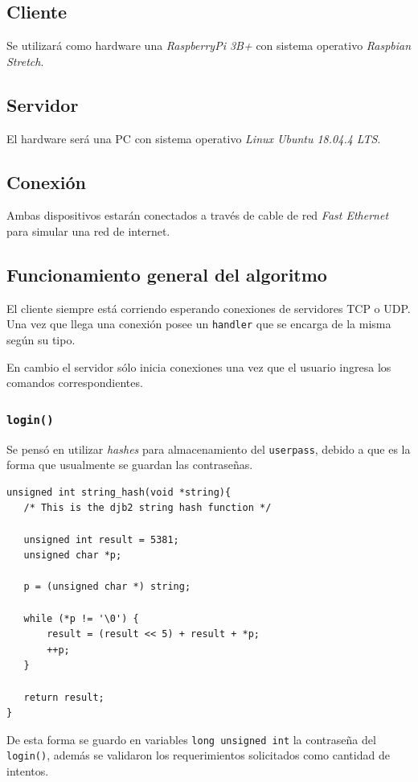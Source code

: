 \documentclass[14.5pt,a4paper]{article}
\begin{document}
\subsection{Cliente}
Se utilizará como hardware una \textit{RaspberryPi 3B+} con sistema operativo \textit{Raspbian Stretch}.

\subsection{Servidor}
El hardware será una PC con sistema operativo \textit{Linux Ubuntu 18.04.4 LTS}.

\subsection{Conexión}
Ambas dispositivos estarán conectados a través de cable de red \textit{Fast Ethernet} para simular una red de internet.

\subsection{Funcionamiento general del algoritmo}
El cliente siempre está corriendo esperando conexiones de servidores TCP o UDP. Una vez que llega una conexión posee un \texttt{handler} que se encarga de la misma según su tipo.

En cambio el servidor sólo inicia conexiones una vez que el usuario ingresa los comandos correspondientes.

\subsubsection{\texttt{login()}}
Se pensó en utilizar \textit{hashes} para almacenamiento del \texttt{userpass}, debido a que es la forma que usualmente se guardan las contraseñas.

\begin{lstlisting}
unsigned int string_hash(void *string){
   /* This is the djb2 string hash function */

   unsigned int result = 5381;
   unsigned char *p;

   p = (unsigned char *) string;

   while (*p != '\0') {
	   result = (result << 5) + result + *p;
	   ++p;
   }

   return result;
}
\end{lstlisting}

De esta forma se guardo en variables \texttt{long unsigned int} la contraseña del \texttt{login()}, además se validaron los requerimientos solicitados como cantidad de intentos.
\end{document}
